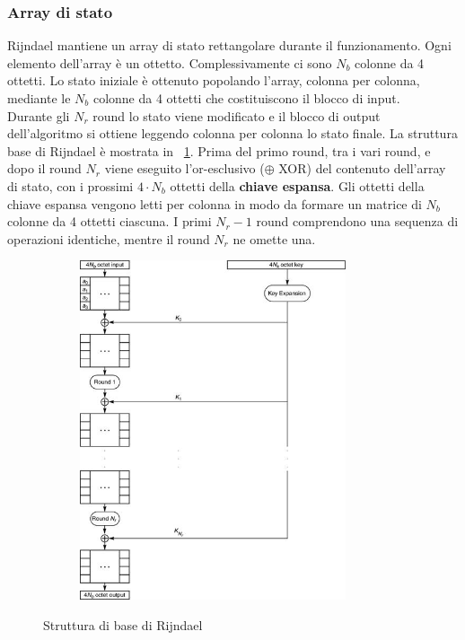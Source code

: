 \subsubsection{Array di stato}
Rijndael mantiene un array di stato rettangolare durante il funzionamento. Ogni elemento dell'array è un ottetto. Complessivamente ci sono $N_{b}$ colonne da 4 ottetti. Lo stato iniziale è ottenuto popolando l’array, colonna per colonna, mediante le $N_{b}$ colonne da 4 ottetti che costituiscono il blocco di input. \\
\newline \newline
Durante gli $N_{r}$ round lo stato viene modificato e il blocco di output dell'algoritmo si ottiene leggendo colonna per colonna lo stato finale. 
\newline \newline 
La struttura base di Rijndael è mostrata in \figurename ~\ref{fig:Rij_struct}. Prima del primo round, tra i vari round, e dopo il round $N_{r}$ viene eseguito l'or-esclusivo ($\oplus$ XOR) del contenuto dell'array di stato, con i prossimi $4\cdot N_{b}$ ottetti della \textbf{chiave espansa}. Gli ottetti della chiave espansa vengono letti per colonna in modo da formare un matrice di $N_{b}$ colonne da 4 ottetti ciascuna. I primi $N_{r} - 1$ round comprendono una sequenza di operazioni identiche, mentre il round $N_{r}$ ne omette una.

\begin{figure}[htbp]
	\centering%
	\subfigure%
	{\includegraphics[height=10cm, width=10cm, keepaspectratio]{Immagini/chiave_segreta/rijndael_struttura.png}}
	\caption{Struttura di base di Rijndael \label{fig:Rij_struct}} 	
\end{figure}

